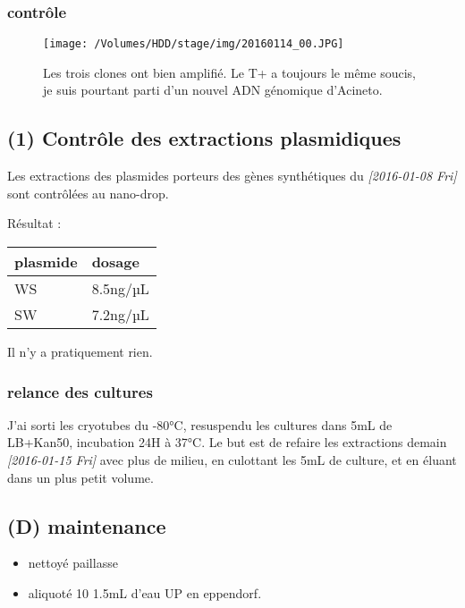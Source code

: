 \documentclass[9pt, oneside, twocolumn]{scrartcl}
\begin{document}
\subsubsection{contrôle}
\label{sec:orgheadline33}


\begin{figure}[htb]
\centering
\texttt{[image: /Volumes/HDD/stage/img/20160114\_00.JPG]}
\caption{Les trois clones ont bien amplifié. Le T+ a toujours le même soucis, je suis pourtant parti d'un nouvel ADN génomique d'Acineto.}
\end{figure}
\subsection{(1) Contrôle des extractions plasmidiques}
\label{sec:orgheadline36}
Les extractions des plasmides porteurs des gènes synthétiques du
\textit{[2016-01-08 Fri] } sont contrôlées au nano-drop.

Résultat :
\begin{center}
\begin{tabular}{ll}
\toprule
plasmide & dosage\\
\midrule
WS & 8.5ng/µL\\
SW & 7.2ng/µL\\
\bottomrule
\end{tabular}
\end{center}

Il n'y a pratiquement rien. 

\subsubsection{relance des cultures}
\label{sec:orgheadline35}
J'ai sorti les cryotubes du -80°C, resuspendu les cultures dans 5mL de LB+Kan50,
incubation 24H à 37°C. Le but est de refaire les extractions demain
\textit{[2016-01-15 Fri] } avec plus de milieu, en culottant les 5mL de culture, et en
éluant dans un plus petit volume.

\subsection{(D) maintenance}
\label{sec:orgheadline37}
\begin{itemize}
\item nettoyé paillasse
\item aliquoté 10 \texttimes{} 1.5mL d'eau UP en eppendorf.
\end{itemize}
\end{document}
